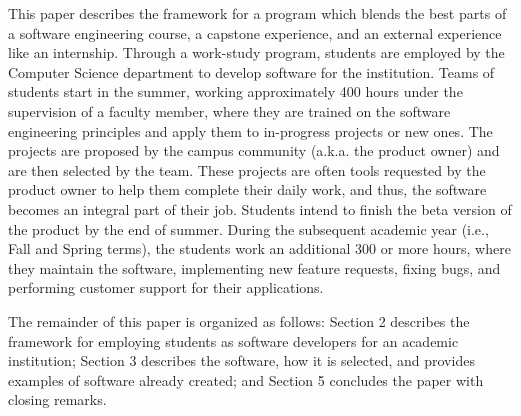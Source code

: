 This paper describes the framework for a program which blends the best parts of a software engineering course, a capstone experience, and an external experience like an internship. Through a work-study program, students are employed by the Computer Science department to develop software for the institution. Teams of students start in the summer, working approximately 400 hours under the supervision of a faculty member, where they are trained on the software engineering principles and apply them to in-progress projects or new ones. The projects are proposed by the campus community (a.k.a. the product owner) and are then selected by the team. These projects are often tools requested by the product owner to help them complete their daily work, and thus, the software becomes an integral part of their job. Students intend to finish the beta version of the product by the end of summer. During the subsequent academic year (i.e., Fall and Spring terms), the students work an additional 300 or more hours, where they maintain the software, implementing new feature requests, fixing bugs, and performing customer support for their applications.

The remainder of this paper is organized as follows: Section 2 describes the framework for employing students as software developers for an academic institution; Section 3 describes the software, how it is selected, and provides examples of software already created; and Section 5 concludes the paper with closing remarks. 
